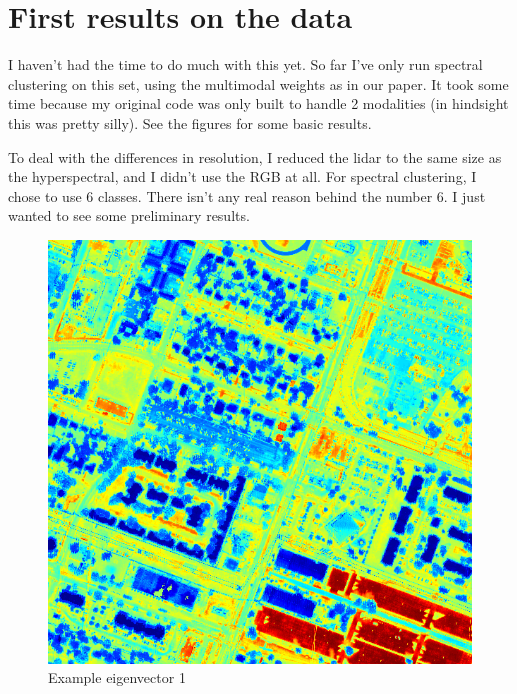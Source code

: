 \documentclass{article}[11pt]
\begin{document}
\section{First results on the data}

I haven't had the time to do much with this yet. So far I've only run spectral clustering on this set, using the multimodal weights as in our paper. It took some time because my original code was only built to handle 2 modalities (in hindsight this was pretty silly). See the figures for some basic results.

To deal with the differences in resolution, I reduced the lidar to the same size as the hyperspectral, and I didn't use the RGB at all. For spectral clustering, I chose to use 6 classes. There isn't any real reason behind the number 6. I just wanted to see some preliminary results.

\begin{figure}
  \includegraphics[width=\linewidth]{evec1.png}
  \caption{Example eigenvector 1}
\end{figure}
\end{document}
